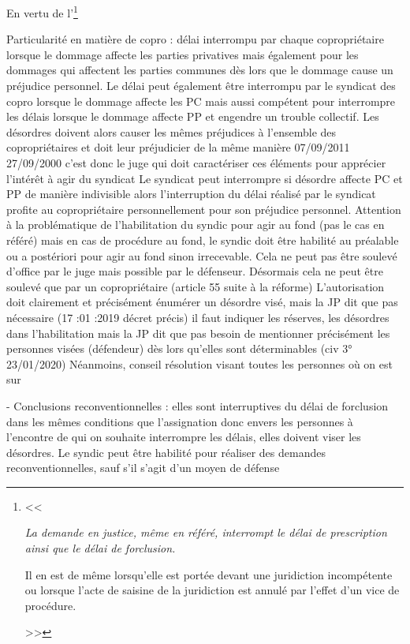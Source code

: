 				En vertu de l'\footnote{<< {\itshape La demande en justice, même en référé, interrompt le délai de prescription ainsi que le délai de forclusion.

					Il en est de même lorsqu'elle est portée devant une juridiction incompétente ou lorsque l'acte de saisine de la juridiction est annulé par l'effet d'un vice de procédure.} >>}

					Particularité en matière de copro : délai interrompu par chaque copropriétaire lorsque le dommage affecte les parties privatives mais également pour les dommages qui affectent les parties communes dès lors que le dommage cause un préjudice personnel. Le délai peut également être interrompu par le syndicat des copro lorsque le dommage affecte les PC mais aussi compétent pour interrompre les délais lorsque le dommage affecte PP et engendre un trouble collectif. Les désordres doivent alors causer les mêmes préjudices à l’ensemble des copropriétaires et doit leur préjudicier de la même manière
					07/09/2011 27/09/2000 c’est donc le juge qui doit caractériser ces éléments pour apprécier l’intérêt à agir du syndicat
					Le syndicat peut interrompre si désordre affecte PC et PP de manière indivisible alors l’interruption du délai réalisé par le syndicat profite au copropriétaire personnellement pour son préjudice personnel. Attention à la problématique de l’habilitation du syndic pour agir au fond (pas le cas en référé) mais en cas de procédure au fond, le syndic doit être habilité au préalable ou a postériori pour agir au fond sinon irrecevable. Cela ne peut pas être soulevé d’office par le juge mais possible par le défenseur. Désormais cela ne peut être soulevé que par un copropriétaire (article 55 suite à la réforme) L’autorisation doit clairement et précisément énumérer un désordre visé, mais la JP dit que pas nécessaire (17 :01 :2019 décret précis) il faut indiquer les réserves, les désordres dans l’habilitation mais la JP dit que pas besoin de mentionner précisément les personnes visées (défendeur) dès lors qu’elles sont déterminables (civ 3° 23/01/2020)
					Néanmoins, conseil résolution visant toutes les personnes où on est sur

					-	Conclusions reconventionnelles : elles sont interruptives du délai de forclusion dans les mêmes conditions que l’assignation donc envers les personnes à l’encontre de qui on souhaite interrompre les délais, elles doivent viser les désordres. Le syndic peut être habilité pour réaliser des demandes reconventionnelles, sauf s’il s’agit d’un moyen de défense


